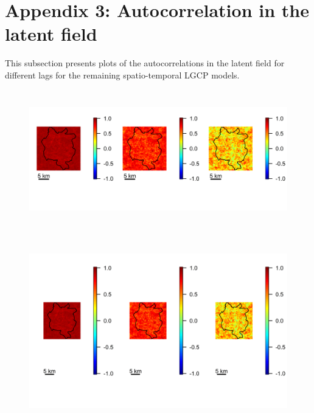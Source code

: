 \documentclass[12pt,a4paper]{report}
\begin{document}
\newpage

\section*{Appendix 3: Autocorrelation in the latent field}

This subsection presents plots of the autocorrelations in the latent field for different lags for the remaining spatio-temporal LGCP models. 

\begin{figure}[H]
	\begin{center}
		\includegraphics[width = \linewidth, height = 60mm]{Autocorrelations in the Latent Field - All Cases.png}
	\end{center}
\end{figure}

\begin{figure}[H]
\begin{center}
\includegraphics[width = \linewidth, height = 80mm]{Autocorrelations in the Latent Field - Major 0.png}
\end{center}
\end{figure}
\end{document}
